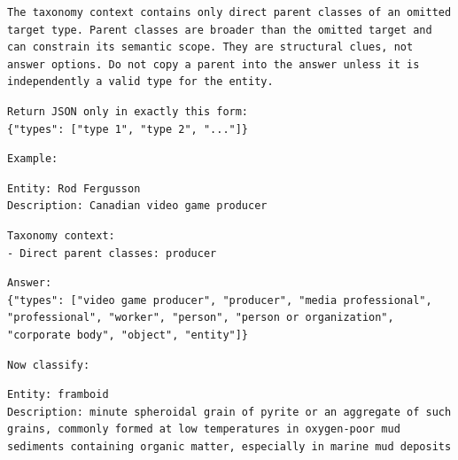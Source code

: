 \begin{Verbatim}[fontsize=\footnotesize,breaklines=true,breakanywhere=true]
The taxonomy context contains only direct parent classes of an omitted target type. Parent classes are broader than the omitted target and can constrain its semantic scope. They are structural clues, not answer options. Do not copy a parent into the answer unless it is independently a valid type for the entity.
\end{Verbatim}

\begin{Verbatim}[fontsize=\footnotesize,breaklines=true,breakanywhere=true]
Return JSON only in exactly this form:
{"types": ["type 1", "type 2", "..."]}
\end{Verbatim}

\begin{Verbatim}[fontsize=\footnotesize,breaklines=true,breakanywhere=true]
Example:
\end{Verbatim}

\begin{Verbatim}[fontsize=\footnotesize,breaklines=true,breakanywhere=true]
Entity: Rod Fergusson
Description: Canadian video game producer
\end{Verbatim}

\begin{Verbatim}[fontsize=\footnotesize,breaklines=true,breakanywhere=true]
Taxonomy context:
- Direct parent classes: producer
\end{Verbatim}

\begin{Verbatim}[fontsize=\footnotesize,breaklines=true,breakanywhere=true]
Answer:
{"types": ["video game producer", "producer", "media professional", "professional", "worker", "person", "person or organization", "corporate body", "object", "entity"]}
\end{Verbatim}

\begin{Verbatim}[fontsize=\footnotesize,breaklines=true,breakanywhere=true]
Now classify:
\end{Verbatim}

\begin{Verbatim}[fontsize=\footnotesize,breaklines=true,breakanywhere=true]
Entity: framboid
Description: minute spheroidal grain of pyrite or an aggregate of such grains, commonly formed at low temperatures in oxygen-poor mud sediments containing organic matter, especially in marine mud deposits
\end{Verbatim}

